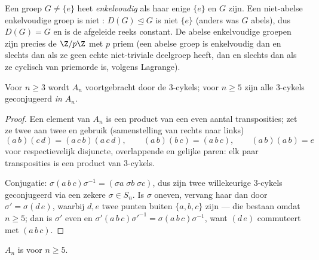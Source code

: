 \begin{definition}\label{def:b3:groups:simple}
Een groep $G \neq \{e\}$ heet
\emph{enkelvoudig} als haar enige
 $\{e\}$ en $G$ zijn. Een niet-abelse enkelvoudige
groep is niet : $D(G) \trianglelefteq G$ is niet $\{e\}$
(anders was $G$ abels), dus $D(G) = G$ en is de afgeleide reeks
constant. De abelse enkelvoudige groepen zijn precies de $\Z/p\Z$
met $p$ priem (een abelse groep is enkelvoudig dan en slechts dan
als ze geen echte niet-triviale deelgroep heeft, dan en slechts dan
als ze cyclisch van priemorde is, volgens Lagrange).
\end{definition}

\begin{lemma}\label{lem:b3:groups:threecycles}
Voor $n \geq 3$ wordt $A_n$ voortgebracht door de $3$-cykels; voor
$n \geq 5$ zijn alle $3$-cykels geconjugeerd \emph{in $A_n$}.
\end{lemma}

\begin{proof}
Een element van $A_n$ is een product van een even aantal
transposities; zet ze twee aan twee en gebruik (samenstelling van
rechts naar links)
\[
(a\,b)(c\,d) = (a\,c\,b)(a\,c\,d), \qquad
(a\,b)(b\,c) = (a\,b\,c), \qquad
(a\,b)(a\,b) = e
\]
voor respectievelijk disjuncte, overlappende en gelijke paren: elk
paar transposities is een product van $3$-cykels.

Conjugatie: $\sigma(a\,b\,c)\sigma^{-1} = (\sigma a\; \sigma b\;
\sigma c)$, dus zijn twee willekeurige $3$-cykels geconjugeerd via
een zekere $\sigma \in S_n$. Is $\sigma$ oneven, vervang haar dan
door $\sigma' = \sigma (d\,e)$, waarbij $d, e$ twee punten buiten
$\{a, b, c\}$ zijn --- die bestaan omdat $n \geq 5$; dan is
$\sigma'$ even en $\sigma'(a\,b\,c) \sigma'^{-1} =
\sigma(a\,b\,c)\sigma^{-1}$, want $(d\,e)$ commuteert met
$(a\,b\,c)$.
\end{proof}

\begin{theorem}\label{thm:b3:groups:ansimple}
$A_n$ is  voor $n \geq 5$.
\end{theorem}

